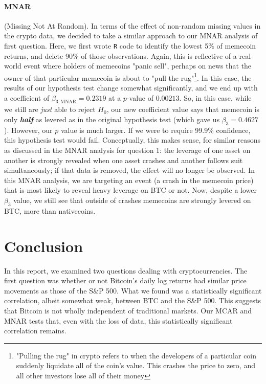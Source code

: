 \documentclass[12pt]{article}
\begin{document}
		\paragraph{MNAR} (Missing Not At Random). In terms of the effect of non-random missing values in the crypto data,  we decided to take a similar approach to our MNAR analysis of first question. Here, we first wrote \texttt{R} code to identify the lowest 5\% of memecoin returns, and delete 90\% of those observations. Again, this is reflective of a real-world event where holders of memecoins "panic sell", perhaps on news that the owner of that particular memecoin is about to "pull the rug"\footnote{"Pulling the rug" in crypto refers to when the developers of a particular coin suddenly liquidate all of the coin's value. This crashes the price to zero, and all other investors lose all of their money}. In this case, the results of our hypothesis test change somewhat significantly, and we end up with a coefficient of $\beta_{3, \mathrm{MNAR}} = 0.2319$ at a $p$-value of  $0.00213$. So, in this case, while we still are \textit{just} able to reject $H_0$, our new coefficient value says that memecoin is only \textbf{\textit{half}} as levered as in the original hypothesis test (which gave us $\beta_3 = 0.4627$). However, our $p$ value is much larger. If we were to require 99.9\% confidence, this hypothesis test would fail. Conceptually, this makes sense,  for similar reasons as discussed in the MNAR analysis for question 1: the leverage of one asset on another is strongly revealed when one asset crashes and another follows suit simultaneously; if that data is removed, the effect will no longer be observed. In this MNAR analysis, we are targeting an event (a crash in the memecoin price) that is most likely to reveal heavy leverage on BTC or not. Now, despite a lower $\beta_3$ value, we still see that outside of crashes memecoins are strongly levered on BTC, more than nativecoins. 
	\section{Conclusion}
	In this report, we examined two questions dealing with cryptocurrencies. The first question was whether or not Bitcoin's daily log returns had similar price movements as those of the S\&P 500. What we found was a statistically significant correlation, albeit somewhat weak, between BTC and the S\&P 500. This suggests that Bitcoin is not wholly independent of traditional markets. Our MCAR and MNAR tests that, even with the loss of data, this statistically significant correlation remains.
	
\end{document}
